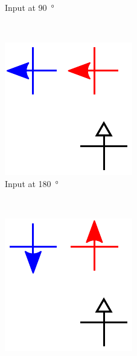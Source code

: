 \documentclass[11pt,a4paper,english]{article}
\newcommand{\rulesep}{\unskip\ \vrule\ }
\begin{document}
\begin{figure}
\begin{subfigure}[t]{0.23\textwidth}
    \caption{Input at \SI{90}{\degree}}
\end{subfigure}
\rulesep
\begin{subfigure}[t]{0.23\textwidth}
    \includegraphics[width=\textwidth]{Figures/half_adder/schematic/000006_inputs/Input 180 deg.pdf}
    \caption{Input at \SI{180}{\degree}}
\end{subfigure}
\rulesep
\begin{subfigure}[t]{0.23\textwidth}
    \includegraphics[width=\textwidth]{Figures/half_adder/schematic/000006_inputs/Input 270 deg.pdf}

\end{subfigure}
\end{figure}
\end{document}

